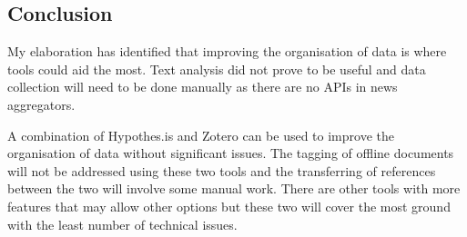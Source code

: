 \documentclass{article}
\begin{document}
\subsection*{Conclusion}

My elaboration has identified that improving the organisation of data is where tools could aid the most. Text analysis did not prove to be useful and data collection will need to be done manually as there are no APIs in news aggregators.

A combination of Hypothes.is and Zotero can be used to improve the organisation of data without significant issues. The tagging of offline documents will not be addressed using these two tools and the transferring of references between the two will involve some manual work. There are other tools with more features that may allow other options but these two will cover the most ground with the least number of technical issues.
\end{document}
